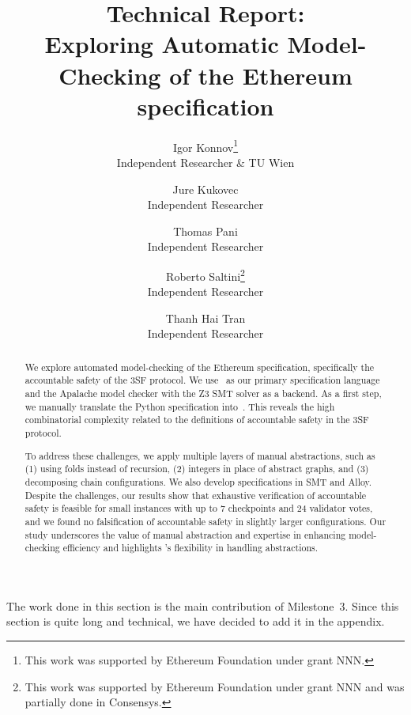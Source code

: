 \documentclass[12pt]{article}
\title{Technical Report:\\
       Exploring Automatic Model-Checking of the Ethereum specification}
\author{%
    Igor Konnov\thanks{This work was supported by Ethereum Foundation
    under grant NNN.}\\ \small Independent Researcher \& TU Wien \\
    \and
    Jure Kukovec\footnotemark[1] \\ \small Independent Researcher \\
    \and
    Thomas Pani\footnotemark[1] \\ \small Independent Researcher \\
    \and
    Roberto Saltini\thanks{This work was supported by Ethereum Foundation
    under grant NNN and was partially done in Consensys.} \\ \small Independent Researcher \\
    \and
    Thanh Hai Tran\footnotemark[2] \\ \small Independent Researcher
}
\date{}
\begin{document}
\maketitle

\begin{abstract}

We explore automated model-checking of the Ethereum specification, specifically
the accountable safety of the 3SF protocol. We use~\tlap{} as our primary
specification language and the Apalache model checker with the Z3 SMT solver as
a backend. As a first step, we manually translate the Python specification
into~\tlap{}. This reveals the high combinatorial complexity related to the
definitions of accountable safety in the 3SF protocol.

To address these challenges, we apply multiple layers of manual abstractions,
such as (1) using folds instead of recursion, (2) integers in place of abstract
graphs, and (3) decomposing chain configurations. We also develop
specifications in SMT and Alloy. Despite the challenges, our results show that
exhaustive verification of accountable safety is feasible for small
instances with up to 7 checkpoints and 24 validator votes, and we found no
falsification of accountable safety in slightly larger configurations. Our
study underscores the value of manual abstraction and expertise in enhancing
model-checking efficiency and highlights \tlap{}'s flexibility in handling
abstractions.

\end{abstract}

\setcounter{tocdepth}{2}  %
\tableofcontents

















\pagebreak

\appendix

The work done in this section is the main contribution of Milestone~3. Since
this section is quite long and technical, we have decided to add it in the
appendix.




\end{document}
